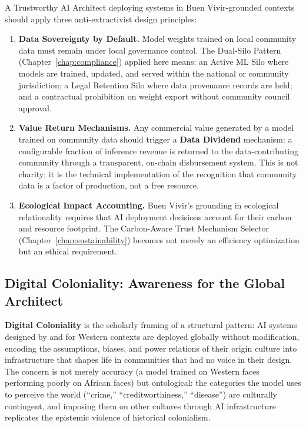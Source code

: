 A Trustworthy AI Architect deploying systems in Buen Vivir-grounded contexts should apply three anti-extractivist design principles:

\begin{enumerate}
  \item \textbf{Data Sovereignty by Default.} Model weights trained on local community data must remain under local governance control. The Dual-Silo Pattern (Chapter~\ref{chap:compliance}) applied here means: an Active ML Silo where models are trained, updated, and served within the national or community jurisdiction; a Legal Retention Silo where data provenance records are held; and a contractual prohibition on weight export without community council approval.
  \item \textbf{Value Return Mechanisms.} Any commercial value generated by a model trained on community data should trigger a \textbf{Data Dividend} mechanism: a configurable fraction of inference revenue is returned to the data-contributing community through a transparent, on-chain disbursement system. This is not charity; it is the technical implementation of the recognition that community data is a factor of production, not a free resource.
  \item \textbf{Ecological Impact Accounting.} Buen Vivir's grounding in ecological relationality requires that AI deployment decisions account for their carbon and resource footprint. The Carbon-Aware Trust Mechanism Selector (Chapter~\ref{chap:sustainability}) becomes not merely an efficiency optimization but an ethical requirement.
\end{enumerate}

\subsection{Digital Coloniality: Awareness for the Global Architect}
\label{subsec:digital_coloniality}

\textbf{Digital Coloniality} is the scholarly framing of a structural pattern: AI systems designed by and for Western contexts are deployed globally without modification, encoding the assumptions, biases, and power relations of their origin culture into infrastructure that shapes life in communities that had no voice in their design. The concern is not merely accuracy (a model trained on Western faces performing poorly on African faces) but ontological: the categories the model uses to perceive the world (``crime,'' ``creditworthiness,'' ``disease'') are culturally contingent, and imposing them on other cultures through AI infrastructure replicates the epistemic violence of historical colonialism.

